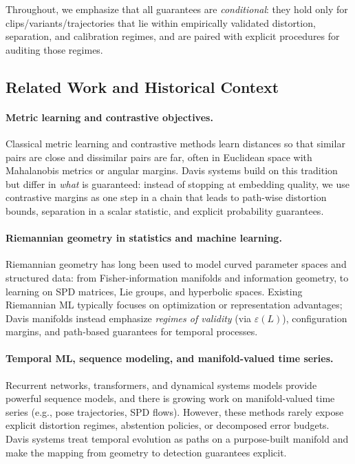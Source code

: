 \documentclass[11pt]{article}
\begin{document}
Throughout, we emphasize that all guarantees are \emph{conditional}: they hold only for clips/variants/trajectories that lie within empirically validated distortion, separation, and calibration regimes, and are paired with explicit procedures for auditing those regimes.

\subsection{Related Work and Historical Context}
\label{sec:related-work}

\paragraph{Metric learning and contrastive objectives.}
Classical metric learning and contrastive methods learn distances so that similar pairs are close and dissimilar pairs are far, often in Euclidean space with Mahalanobis metrics or angular margins. Davis systems build on this tradition but differ in \emph{what} is guaranteed: instead of stopping at embedding quality, we use contrastive margins as one step in a chain that leads to path-wise distortion bounds, separation in a scalar statistic, and explicit probability guarantees.

\paragraph{Riemannian geometry in statistics and machine learning.}
Riemannian geometry has long been used to model curved parameter spaces and structured data: from Fisher-information manifolds and information geometry, to learning on SPD matrices, Lie groups, and hyperbolic spaces. Existing Riemannian ML typically focuses on optimization or representation advantages; Davis manifolds instead emphasize \emph{regimes of validity} (via $\varepsilon(L)$), configuration margins, and path-based guarantees for temporal processes.

\paragraph{Temporal ML, sequence modeling, and manifold-valued time series.}
Recurrent networks, transformers, and dynamical systems models provide powerful sequence models, and there is growing work on manifold-valued time series (e.g., pose trajectories, SPD flows). However, these methods rarely expose explicit distortion regimes, abstention policies, or decomposed error budgets. Davis systems treat temporal evolution as paths on a purpose-built manifold and make the mapping from geometry to detection guarantees explicit.
\end{document}

